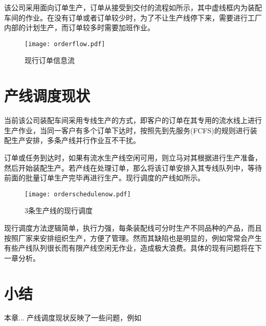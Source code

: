 该公司采用面向订单生产，订单从接受到交付的流程如所示，其中虚线框内为装配车间的作业。在没有订单或者订单较少时，为了不让生产线停下来，需要进行工厂内部的计划生产，而订单较多时需要加班作业。
\begin{figure}[h]
\centering
\texttt{[image: orderflow.pdf]}
\caption{现行订单信息流\label{fig:orderflow}}
\end{figure}

\section{产线调度现状}
当前该公司装配车间采用专线生产的方式，即客户的订单在其专用的流水线上进行生产作业，当同一客户有多个订单下达时，按照先到先服务(FCFS)的规则进行装配生产安排，多条产线并行作业互不干扰。

订单或任务到达时，如果有流水生产线空闲可用，则立马对其根据进行生产准备，然后开始装配生产。若产线在处理订单，那么将该订单安排入其专线队列中，等待前面的批量订单生产完毕再进行生产。现行调度的产线如所示。

\begin{figure}[h]
\caption{3条生产线的现行调度\label{fig:3nowschedule}}\texttt{[image: orderschedulenow.pdf]}
\end{figure}

现行调度方法逻辑简单，执行力强，每条装配线可分时生产不同品种的产品，而且按照厂家来安排组织生产，方便了管理。然而其缺陷也是明显的，例如常常会产生有些产线队列很长而有限产线空闲无作业，造成极大浪费。具体的现有问题将在下一章分析。
\section{小结}
本章...
产线调度现状反映了一些问题，例如
